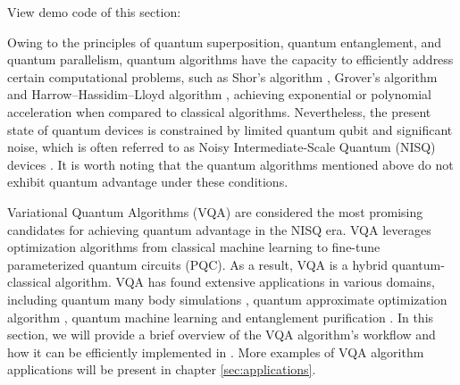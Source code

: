 



View demo code of this section: 

Owing to the principles of quantum superposition, quantum entanglement, and quantum parallelism, quantum algorithms have the capacity to efficiently address certain computational problems, such as Shor's algorithm \cite{shor1994algorithms}, Grover's algorithm \cite{grover1996fast,long2001grover} and Harrow–Hassidim–Lloyd algorithm \cite{harrow2009quantum}, achieving exponential or polynomial acceleration when compared to classical algorithms. Nevertheless, the present state of quantum devices is constrained by limited quantum qubit and significant noise, which is often referred to as Noisy Intermediate-Scale Quantum (NISQ) devices \cite{preskill2018quantum}. It is worth noting that the quantum algorithms mentioned above do not exhibit quantum advantage under these conditions.

Variational Quantum Algorithms (VQA) \cite{cerezo2021variational,yuan2019theory,xu2021variational} are considered the most promising candidates for achieving quantum advantage in the NISQ era. VQA leverages optimization algorithms from classical machine learning to fine-tune parameterized quantum circuits (PQC). As a result, VQA is a hybrid quantum-classical algorithm. VQA has found extensive applications in various domains, including quantum many body simulations \cite{peruzzo2014variational,kandala2017hardware,kokail2019self,lyu2023variational,Lyu2023symmetryenhanced,cao2022progress}, quantum approximate optimization algorithm \cite{farhi2014quantum,patti2022variational,chandarana2023digitized}, quantum machine learning \cite{benedetti2019parameterized,wei2022quantum,lloyd2018quantum,biamonte2017quantum,abbas2021power} and entanglement purification \cite{zhang2023variational}. In this section, we will provide a brief overview of the VQA algorithm's workflow and how it can be efficiently implemented in \MindQuantum. More examples of VQA algorithm applications will be present in chapter \ref{sec:applications}.

